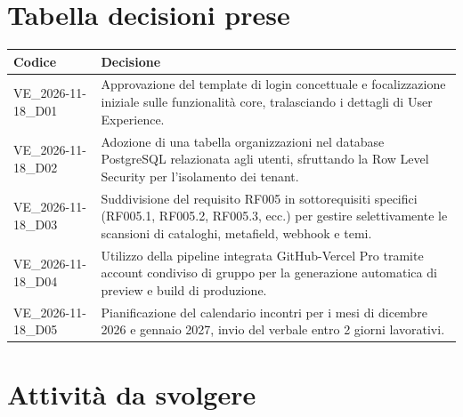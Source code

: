 \newpage

\section{Tabella decisioni prese}

\renewcommand{\arraystretch}{1.3}
\noindent
\begin{tabularx}{\textwidth}{|l|X|}
    \hline
    \textbf{Codice} & \textbf{Decisione} \\
    \hline
    VE\_2026-11-18\_D01 & Approvazione del template di login concettuale e focalizzazione iniziale sulle funzionalità core, tralasciando i dettagli di User Experience. \\
    \hline
    VE\_2026-11-18\_D02 & Adozione di una tabella organizzazioni nel database PostgreSQL relazionata agli utenti, sfruttando la Row Level Security per l'isolamento dei tenant. \\
    \hline
    VE\_2026-11-18\_D03 & Suddivisione del requisito RF005 in sottorequisiti specifici (RF005.1, RF005.2, RF005.3, ecc.) per gestire selettivamente le scansioni di cataloghi, metafield, webhook e temi. \\
    \hline
    VE\_2026-11-18\_D04 & Utilizzo della pipeline integrata GitHub-Vercel Pro tramite account condiviso di gruppo per la generazione automatica di preview e build di produzione. \\
    \hline
    VE\_2026-11-18\_D05 & Pianificazione del calendario incontri per i mesi di dicembre 2026 e gennaio 2027, invio del verbale entro 2 giorni lavorativi. \\
    \hline
\end{tabularx}

\section{Attività da svolgere}

